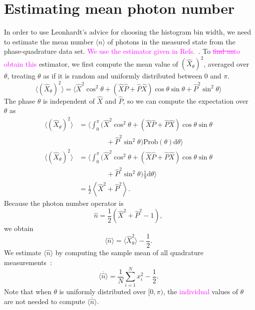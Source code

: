 \documentclass[
reprint,
superscriptaddress,
showpacs,
amsmath,
amssymb,
aps,
pra,
longbibliography
]{revtex4-1}
\providecommand{\aucmnt}[1]{#1}
\providecommand{\editcolor}[2]{\textcolor{#1}{#2}}
\providecommand{\aucmnt}[1]{}
\providecommand{\editcolor}[2]{#2}
\newcommand{\HV}[1]{\editcolor{blue}{#1}}
\newcommand{\SG}[1]{\editcolor{magenta}{#1}}
\newcommand{\SGs}[1]{\aucmnt{\editcolor{magenta}{\sout{#1}}}}
\begin{document}
\section{Estimating mean photon number}
\label{sec-photon-estimation}
In order to use Leonhardt's advice for choosing the histogram bin
width, we need to estimate the mean number $\langle n \rangle$ of
photons in the measured state from the phase-quadrature data
set. \SG{We use the estimator given in
  Refs.~\cite{Hradil2,Munroe1996}}.  To \SGs{find an}\SG{to obtain
  this} estimator, we first compute the mean value of
$(\hat{X}_{\theta})^{2}$, averaged over $\theta$, treating $\theta$ as
if it is random and uniformly distributed between $0$ and $\pi$.
\begin{equation}
  \langle (\hat{X}_{\theta})^{2} \rangle = \langle \hat{X}^{2}\cos^{2}\theta + (\hat{X}\hat{P}+\hat{P}\hat{X})\cos\theta\sin\theta + \hat{P}^{2}\sin^{2}\theta \rangle
\end{equation}
The phase $\theta$ is independent of $\hat{X}$ and $\hat{P}$, so we
can compute the expectation over $\theta$ as
\begin{align}
  \langle (\hat{X}_{\theta})^{2} \rangle &= \Big\langle \int_{0}^{\pi} (\hat{X}^{2}\cos^{2}\theta + (\hat{X}\hat{P}+\hat{P}\hat{X})\cos\theta\sin\theta \nonumber \\
                                         & \qquad \qquad + \hat{P}^{2}\sin^{2}\theta) \mathrm{Prob}(\theta) \mathrm{d}\theta \Big\rangle \\
  \langle (\hat{X}_{\theta})^{2} \rangle &= \Big\langle \int_{0}^{\pi} (\hat{X}^{2}\cos^{2}\theta + (\hat{X}\hat{P}+\hat{P}\hat{X})\cos\theta\sin\theta \nonumber \\
                                         & \qquad \qquad + \hat{P}^{2}\sin^{2}\theta) \frac{1}{\pi} \mathrm{d}\theta \Big\rangle \\
                                         &= \frac{1}{2}\left\langle \hat{X}^{2} + \hat{P}^{2} \right\rangle.
\end{align}
Because the photon number operator is
\begin{equation}
  \hat{n} = \frac{1}{2}\left(\hat{X}^{2}+\hat{P}^{2}-1\right),
\end{equation}
we obtain
\begin{equation}
  \langle\hat{n}\rangle = \langle \hat{X}_{\theta}^{2}\rangle-\frac{1}{2}. 
\end{equation}
We estimate $\langle \hat{n} \rangle$ by computing the sample
mean of all quadrature measurements~\HV{\cite{Hradil2,Munroe1996}}:
\begin{equation}
  \overline{\langle \hat{n} \rangle} = \frac{1}{N} \sum_{i=1}^{N}x_{i}^{2} - \frac{1}{2}.
  \label{eq-photon-estimation}
\end{equation}
Note that when $\theta$ is uniformly distributed over $[0,\pi)$, the
\SG{individual} values of $\theta$ are not needed to compute
$\overline{\langle \hat{n} \rangle}$.
\end{document}
